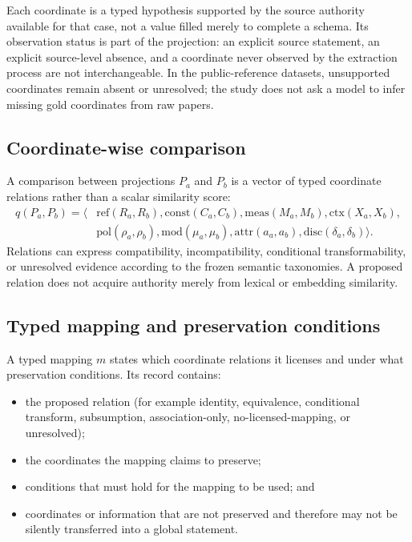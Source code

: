 Each coordinate is a typed hypothesis supported by the source authority
available for that case, not a value filled merely to complete a schema. Its
observation status is part of the projection: an explicit source statement, an
explicit source-level absence, and a coordinate never observed by the
extraction process are not interchangeable. In the public-reference datasets,
unsupported coordinates remain absent or unresolved; the study does not ask a
model to infer missing gold coordinates from raw papers.

\subsection{Coordinate-wise comparison}

A comparison between projections $P_a$ and $P_b$ is a vector of typed
coordinate relations rather than a scalar similarity score:
\begin{equation}
\begin{split}
    q(P_a,P_b) = \langle &\mathrm{ref}(R_a,R_b),
    \mathrm{const}(C_a,C_b),
    \mathrm{meas}(M_a,M_b),
    \mathrm{ctx}(X_a,X_b),\\
    &\mathrm{pol}(\rho_a,\rho_b),
    \mathrm{mod}(\mu_a,\mu_b),
    \mathrm{attr}(a_a,a_b),
    \mathrm{disc}(\delta_a,\delta_b) \rangle .
\end{split}
\end{equation}
Relations can express compatibility, incompatibility, conditional
transformability, or unresolved evidence according to the frozen semantic
taxonomies. A proposed relation does not acquire authority merely from lexical
or embedding similarity.

\subsection{Typed mapping and preservation conditions}

A typed mapping $m$ states which coordinate relations it licenses and under
what preservation conditions. Its record contains:

\begin{itemize}
    \item the proposed relation (for example identity, equivalence,
          conditional transform, subsumption, association-only,
          no-licensed-mapping, or unresolved);
    \item the coordinates the mapping claims to preserve;
    \item conditions that must hold for the mapping to be used; and
    \item coordinates or information that are not preserved and therefore may
          not be silently transferred into a global statement.
\end{itemize}


